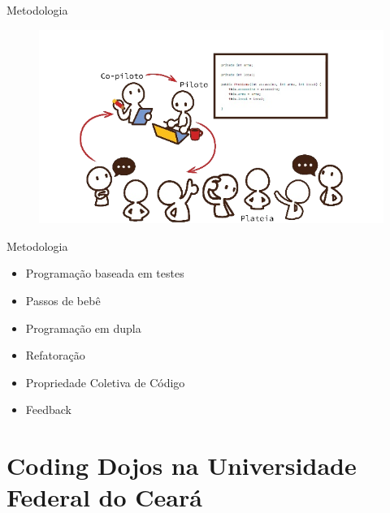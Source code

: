 \documentclass[10pt]{beamer}
\begin{document}
\begin{frame}{Metodologia}

\begin{figure}[H]
  \centering
  \begin{minipage}[b]{10cm}
	\includegraphics[width=\textwidth]{figuras/metodologia.png}
  \end{minipage}
\end{figure}

\end{frame}


\begin{frame}{Metodologia}

	\begin{itemize}
		\item Programação baseada em testes
		\item Passos de bebê
		\item Programação em dupla
		\item Refatora\c{c}\~ao
		\item Propriedade Coletiva de C\'odigo
		\item Feedback
	\end{itemize}
	
\end{frame}

\section{Coding Dojos na Universidade Federal do Cear\'a}
\end{document}
